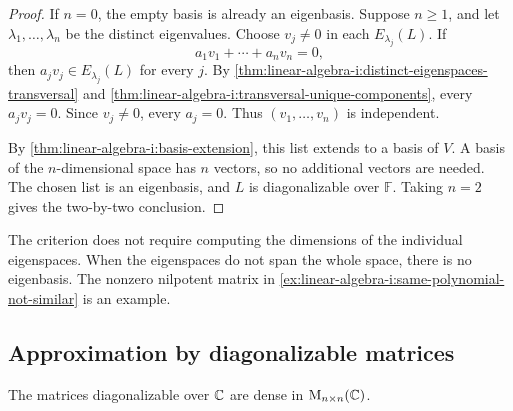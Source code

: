 \begin{pendingreview}
\begin{proof}
  If \(n=0\), the empty basis is already an eigenbasis. Suppose
  \(n\ge1\), and let \(\lambda_1,\ldots,\lambda_n\) be the distinct
  eigenvalues. Choose \(v_j\ne0\) in each \(E_{\lambda_j}(L)\).
  If
  \[
    a_1v_1+\cdots+a_nv_n=0,
  \]
  then \(a_jv_j\in E_{\lambda_j}(L)\) for every \(j\).
  By \autoref{thm:linear-algebra-i:distinct-eigenspaces-transversal}
  and \autoref{thm:linear-algebra-i:transversal-unique-components},
  every \(a_jv_j=0\). Since \(v_j\ne0\), every \(a_j=0\).
  Thus \((v_1,\ldots,v_n)\) is independent.

  By \autoref{thm:linear-algebra-i:basis-extension}, this list extends
  to a basis of \(V\). A basis of the \(n\)-dimensional space has
  \(n\) vectors, so no additional vectors are needed. The chosen list
  is an eigenbasis, and \(L\) is diagonalizable over \(\mathbb F\).
  Taking \(n=2\) gives the two-by-two conclusion.
\end{proof}
\end{pendingreview}

The criterion does not require computing the dimensions of the individual
eigenspaces. When the eigenspaces do not span the whole space, there is
no eigenbasis. The nonzero nilpotent matrix in
\autoref{ex:linear-algebra-i:same-polynomial-not-similar} is an example.

\subsection{Approximation by diagonalizable matrices}

\begin{proposition}
  \label{thm:linear-algebra-i:density-of-diagonalizable-complex-matrices}
  The matrices diagonalizable over \(\mathbb{C}\) are dense in
  \(\mathrm M_{n\times n}(\mathbb{C})\).
\end{proposition}

